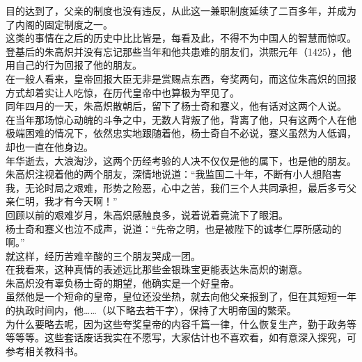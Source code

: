 \begin{multicols}{\theparacolNo}
目的达到了，父亲的制度也没有违反，从此这一兼职制度延续了二百多年，并成为了内阁的固定制度之一。\\

这类的事情在之后的历史中比比皆是，每看及此，不得不为中国人的智慧而惊叹。\\

登基后的朱高炽并没有忘记那些当年和他共患难的朋友们，洪熙元年（1425），他用自己的行为回报了他的朋友。\\

在一般人看来，皇帝回报大臣无非是赏赐点东西，夸奖两句，而这位朱高炽的回报方式却着实让人吃惊，在历代皇帝中也算极为罕见了。\\

同年四月的一天，朱高炽散朝后，留下了杨士奇和蹇义，他有话对这两个人说。\\

在当年那场惊心动魄的斗争之中，无数人背叛了他，背离了他，只有这两个人在他极端困难的情况下，依然忠实地跟随着他，杨士奇自不必说，蹇义虽然为人低调，却也一直在他身边。\\

年华逝去，大浪淘沙，这两个历经考验的人决不仅仅是他的属下，也是他的朋友。\\

朱高炽注视着他的两个朋友，深情地说道：“我监国二十年，不断有小人想陷害我，无论时局之艰难，形势之险恶，心中之苦，我们三个人共同承担，最后多亏父亲仁明，我才有今天啊！”\\

回顾以前的艰难岁月，朱高炽感触良多，说着说着竟流下了眼泪。\\

杨士奇和蹇义也泣不成声，说道：“先帝之明，也是被陛下的诚孝仁厚所感动的啊。”\\

就这样，经历苦难辛酸的三个朋友哭成一团。\\

在我看来，这种真情的表述远比那些金银珠宝更能表达朱高炽的谢意。\\

朱高炽没有辜负杨士奇的期望，他确实是一个好皇帝。\\

虽然他是一个短命的皇帝，皇位还没坐热，就去向他父亲报到了，但在其短短一年的执政时间内，他……（以下略去若干字），保持了大明帝国的繁荣。\\

为什么要略去呢，因为这些夸奖皇帝的内容千篇一律，什么恢复生产，勤于政务等等等等。这些套话废话我实在不愿写，大家估计也不喜欢看，如有意深入探究，可参考相关教科书。\\


\end{multicols}
